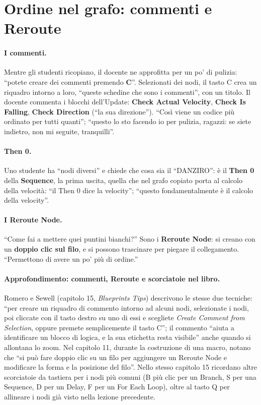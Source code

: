 \section{Ordine nel grafo: commenti e Reroute}
\label{ue10:sec:commenti}

\paragraph{I commenti.} Mentre gli studenti ricopiano, il docente ne approfitta per un po'
di pulizia: ``potete creare dei commenti premendo \textbf{C}''. Selezionati dei nodi,
il tasto C crea un riquadro intorno a loro, ``queste schedine che sono i commenti'', con
un titolo. Il docente commenta i blocchi dell'Update: \textbf{Check Actual Velocity},
\textbf{Check Is Falling}, \textbf{Check Direction} (``la sua direzione''). ``Così viene
un codice più ordinato per tutti quanti''; ``questo lo sto facendo io per pulizia,
ragazzi: se siete indietro, non mi seguite, tranquilli''.

\paragraph{Then 0.} Uno studente ha ``nodi diversi'' e chiede che cosa sia il
``DANZIRO'': è il \textbf{Then 0} della \textbf{Sequence}, la prima uscita, quella che nel
grafo copiato porta al calcolo della velocità: ``il Then 0 dice la velocity'';
``questo fondamentalmente è il calcolo della velocity''.

\paragraph{I Reroute Node.} ``Come fai a mettere quei puntini bianchi?'' Sono i
\textbf{Reroute Node}: si creano con un \textbf{doppio clic sul filo}, e si possono
trascinare per piegare il collegamento. ``Permettono di avere un po' più di ordine.''

\paragraph{Approfondimento: commenti, Reroute e scorciatoie nel libro.} Romero e Sewell
(capitolo 15, \emph{Blueprints Tips}) descrivono le stesse due tecniche: ``per creare un
riquadro di commento intorno ad alcuni nodi, selezionate i nodi, poi cliccate con il tasto
destro su uno di essi e scegliete \emph{Create Comment from Selection}, oppure premete
semplicemente il tasto C''; il commento ``aiuta a identificare un blocco di logica, e la
sua etichetta resta visibile'' anche quando si allontana lo zoom. Nel capitolo 11, durante
la costruzione di una macro, notano che ``si può fare doppio clic su un filo per
aggiungere un Reroute Node e modificare la forma e la posizione del filo''. Nello stesso
capitolo 15 ricordano altre scorciatoie da tastiera per i nodi più comuni (B più clic per
un Branch, S per una Sequence, D per un Delay, F per un For Each Loop), oltre al tasto Q
per allineare i nodi già visto nella lezione precedente.


